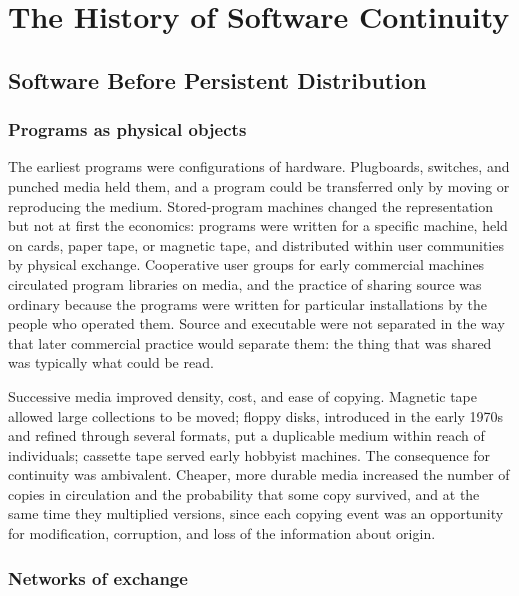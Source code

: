 \documentclass[11pt,twoside,openright]{book}
\theoremstyle{plain}
\theoremstyle{definition}
\theoremstyle{remark}
\begin{document}
\part{The History of Software Continuity}\label{part:history}

\chapter{Software Before Persistent Distribution}\label{ch:before}

\section{Programs as physical objects}

The earliest programs were configurations of hardware. Plugboards, switches, and punched media held them, and a program could be transferred only by moving or reproducing the medium. Stored-program machines changed the representation but not at first the economics: programs were written for a specific machine, held on cards, paper tape, or magnetic tape, and distributed within user communities by physical exchange. Cooperative user groups for early commercial machines circulated program libraries on media, and the practice of sharing source was ordinary because the programs were written for particular installations by the people who operated them. Source and executable were not separated in the way that later commercial practice would separate them: the thing that was shared was typically what could be read.

Successive media improved density, cost, and ease of copying. Magnetic tape allowed large collections to be moved; floppy disks, introduced in the early 1970s and refined through several formats, put a duplicable medium within reach of individuals; cassette tape served early hobbyist machines. The consequence for continuity was ambivalent. Cheaper, more durable media increased the number of copies in circulation and the probability that some copy survived, and at the same time they multiplied versions, since each copying event was an opportunity for modification, corruption, and loss of the information about origin.

\section{Networks of exchange}
\end{document}
